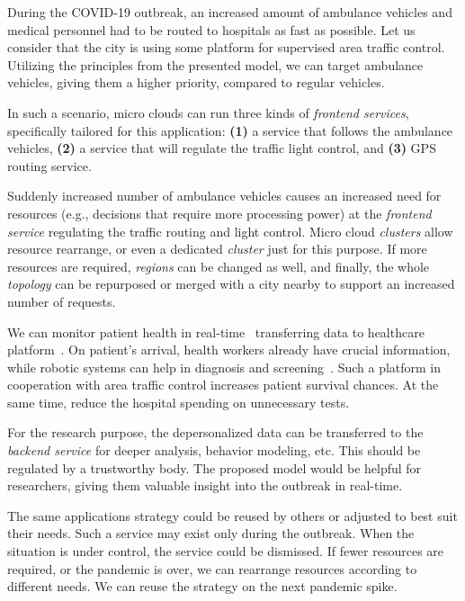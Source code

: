 During the COVID-19 outbreak, an increased amount of ambulance vehicles and medical personnel had to be routed to hospitals as fast as possible. Let us consider that the city is using some platform for supervised area traffic control. Utilizing the principles from the presented model, we can target ambulance vehicles, giving them a higher priority, compared to regular vehicles.

In such a scenario, micro clouds can run three kinds of \emph{frontend services}, specifically tailored for this application: \textbf{(1)} a service that follows the ambulance vehicles, \textbf{(2)} a service that will regulate the traffic light control, and \textbf{(3)} GPS routing service.

Suddenly increased number of ambulance vehicles causes an increased need for resources (e.g., decisions that require more processing power) at the \emph{frontend service} regulating the traffic routing and light control. Micro cloud \emph{clusters} allow resource rearrange, or even a dedicated \emph{cluster} just for this purpose. If more resources are required, \emph{regions} can be changed as well, and finally, the whole \emph{topology} can be repurposed or merged with a city nearby to support an increased number of requests.

We can monitor patient health in real-time~\cite{BCAK19, JeonK19, ChiariniRAMG13} transferring data to healthcare platform~\cite{OmarBBKR19, inproceedingsSimic5}. On patient's arrival, health workers already have crucial information, while robotic systems can help in diagnosis and screening~\cite{ShenGLMDXHKCZT21}. Such a platform in cooperation with area traffic control increases patient survival chances. At the same time, reduce the hospital spending on unnecessary tests.

For the research purpose, the depersonalized data can be transferred to the \emph{backend service} for deeper analysis, behavior modeling, etc. This should be regulated by a trustworthy body. The proposed model would be helpful for researchers, giving them valuable insight into the outbreak in real-time. 

The same applications strategy could be reused by others or adjusted to best suit their needs. Such a service may exist only during the outbreak. When the situation is under control, the service could be dismissed. If fewer resources are required, or the pandemic is over, we can rearrange resources according to different needs. We can reuse the strategy on the next pandemic spike.
%
%